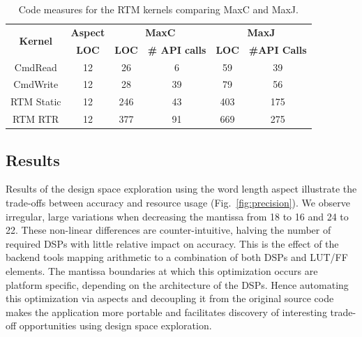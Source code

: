 \begin{table}[!h]
  \renewcommand{\arraystretch}{1.3}
  \centering
  \caption{Code measures for the RTM kernels comparing MaxC and
    MaxJ.}
  \label{table:loc}
  \begin{tabular}{c|ccc|cc}
    \hline
    \multirow{2}{*}{\bf{Kernel}} & \bf{Aspect } & \multicolumn{2}{c|}{\bf{MaxC}} & \multicolumn{2}{c}{\bf{MaxJ}}                   \\
    \                            & \bf{LOC}     & \bf{LOC}                       & \bf{\# API calls} & \bf{LOC} & \bf{\#API Calls} \\
    \hline \hline
    CmdRead                      & 12           & 26                             &      6         & 59       &      39        \\
    CmdWrite                     & 12           & 28                             &      39        & 79      &       56         \\
    RTM Static                   & 12           & 246                            &     43         & 403     &       175        \\
    RTM RTR                      & 12           & 377                            &     91         & 669     &       275       \\
  \end{tabular}
  \vspace{-3mm}
\end{table}

\subsection{Results}

Results of the design space exploration using the word length aspect
illustrate the trade-offs between accuracy and resource usage (Fig.~\ref{fig:precision}). We observe irregular, large variations when
decreasing the mantissa from 18 to 16 and 24 to 22. These non-linear
differences are counter-intuitive, halving the number of required DSPs
with little relative impact on accuracy. This is the effect of the
backend tools mapping arithmetic to a combination of both DSPs and
LUT/FF elements. The mantissa boundaries at which this optimization
occurs are platform specific, depending on the architecture of the
DSPs. Hence automating this optimization via aspects and decoupling it
from the original source code makes the application more portable and
facilitates discovery of interesting trade-off opportunities using
design space exploration.

